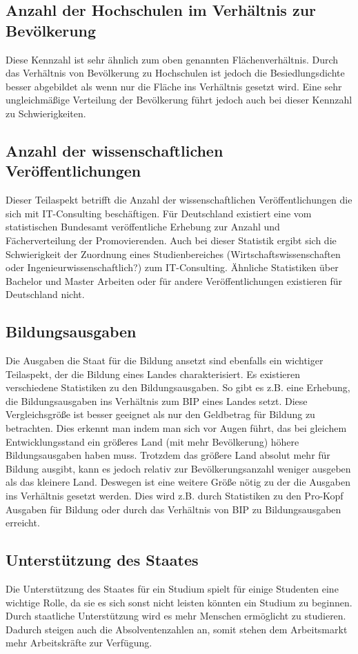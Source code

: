 \subsection{ Anzahl der Hochschulen im Verhältnis zur Bevölkerung}
Diese Kennzahl ist sehr ähnlich zum oben genannten Flächenverhältnis. Durch das Verhältnis von Bevölkerung zu Hochschulen ist jedoch die Besiedlungsdichte besser abgebildet als wenn nur die Fläche ins Verhältnis gesetzt wird.
Eine sehr ungleichmäßige Verteilung der Bevölkerung führt jedoch auch bei dieser Kennzahl zu Schwierigkeiten.

\subsection{ Anzahl der wissenschaftlichen Veröffentlichungen}
Dieser Teilaspekt betrifft die Anzahl der wissenschaftlichen Veröffentlichungen die sich mit IT-Consulting beschäftigen. 
Für Deutschland existiert eine vom statistischen Bundesamt veröffentliche Erhebung zur Anzahl und Fächerverteilung der Promovierenden.\cite{destatis}
Auch bei dieser Statistik ergibt sich die Schwierigkeit der Zuordnung eines Studienbereiches (Wirtschaftswissenschaften oder Ingenieurwissenschaftlich?) zum IT-Consulting. Ähnliche Statistiken über Bachelor und Master Arbeiten oder für andere Veröffentlichungen existieren für Deutschland nicht. 

\subsection{ Bildungsausgaben}
Die Ausgaben die Staat für die Bildung ansetzt sind ebenfalls ein wichtiger Teilaspekt, der die Bildung eines Landes charakterisiert.
Es existieren verschiedene Statistiken zu den Bildungsausgaben. So gibt es z.B. eine Erhebung, die Bildungsausgaben ins Verhältnis zum BIP eines Landes setzt. Diese Vergleichsgröße ist besser geeignet als nur den Geldbetrag für Bildung zu betrachten. Dies erkennt man indem man sich vor Augen führt, das bei gleichem Entwicklungsstand ein größeres Land (mit mehr Bevölkerung) höhere Bildungsausgaben haben muss. Trotzdem das größere Land absolut mehr für Bildung ausgibt, kann es jedoch relativ zur Bevölkerungsanzahl weniger ausgeben als das kleinere Land. Deswegen ist eine weitere Größe nötig zu der die Ausgaben ins Verhältnis gesetzt werden. Dies wird z.B. durch Statistiken zu den Pro-Kopf Ausgaben für Bildung oder durch das Verhältnis von BIP zu Bildungsausgaben erreicht.

\subsection{ Unterstützung des Staates} 
Die Unterstützung des Staates für ein Studium spielt für einige Studenten eine wichtige Rolle, da sie es sich sonst nicht leisten könnten ein Studium zu beginnen. Durch staatliche Unterstützung wird es mehr Menschen ermöglicht zu studieren. Dadurch steigen auch die Absolventenzahlen an, somit stehen dem Arbeitsmarkt mehr Arbeitskräfte zur Verfügung.

